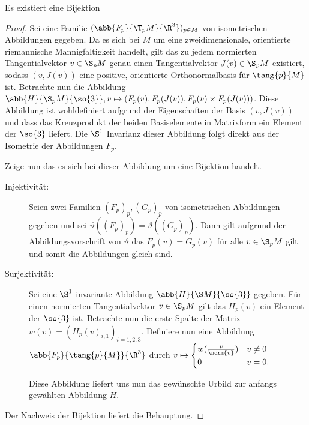 \begin{Satz}
	Es existiert eine Bijektion
\begin{center}
\end{center}


\begin{proof}
	Sei eine Familie $(\abb{F_p}{\T_pM}{\R^3})_{p\in M}$ von 
	isometrischen Abbildungen gegeben.
	Da es sich bei $M$ um eine zweidimensionale, orientierte riemannische Mannigfaltigkeit handelt, gilt das zu jedem normierten Tangentialvektor $v \in \S_p M$ genau einen Tangentialvektor $J(v) \in \S_p M$
	existiert, sodass $(v,J(v))$ eine positive, orientierte Orthonormalbasis für	$\tang{p}{M}$ ist. Betrachte nun die Abbildung $\abb{H}{\S_p%
		M}{\so{3}}, v \mapsto (F_p(v),F_p(J(v)),F_p(v)\times F_p(J(v)))$. 
	Diese Abbildung ist wohldefiniert aufgrund der Eigenschaften
	der Basis $(v,J(v))$ und dass das Kreuzprodukt der beiden
	Basiselemente in Matrixform ein Element der $\so{3}$ liefert.
	Die $\S^1$ Invarianz dieser Abbildung folgt direkt
	aus der Isometrie der Abbildungen $F_p$.
	
	Zeige nun das es sich bei dieser Abbildung um eine Bijektion handelt. 
	\begin{description}
		\item[Injektivität:] Seien zwei Familien $(F_p)_p,(G_p)_p$ von
		isometrischen Abbildungen gegeben und sei $\vartheta((F_p)_p)=\vartheta((G_p)_p)$. Dann gilt aufgrund
		der Abbildungsvorschrift von $\vartheta$ das $F_p(v)=G_p(v)$
		für alle $v \in \S_p M$ gilt und somit die Abbildungen gleich
		sind.
		\item[Surjektivität:] Sei eine $\S^1$-invariante Abbildung
		$\abb{H}{\S M}{\so{3}}$ gegeben. Für einen normierten
		Tangentialvektor $v \in \S_p M$ gilt das $H_p(v)$ ein
		Element der $\so{3}$ ist. Betrachte nun die erste Spalte
		der Matrix $w(v)=(H_p(v)_{i,1})_{i=1,2,3}$. Definiere nun eine
		Abbildung $\abb{F_p}{\tang{p}{M}}{\R^3}$ durch 
		$v \mapsto \begin{cases}
		w(\frac{v}{\norm{v}}) & v \neq 0 \\
		0 & v=0.
		\end{cases}$
		
		Diese Abbildung liefert uns nun das gewünschte Urbild zur
		anfangs gewählten Abbildung $H$. 
	\end{description}
	Der Nachweis der Bijektion liefert die Behauptung.
\end{proof}

\end{Satz}

